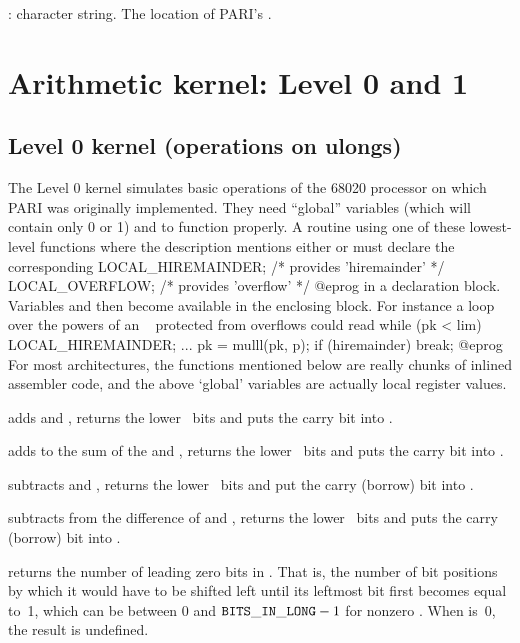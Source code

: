 
: character string. The location of PARI's .

\newpage
\chapter{Arithmetic kernel: Level 0 and 1}

\section{Level 0 kernel (operations on ulongs)}

The Level 0 kernel simulates basic operations of the 68020 processor on which
PARI was originally implemented. They need ``global''  variables
 (which will contain only 0 or 1) and  to
function properly. A routine using one of these lowest-level functions
where the description mentions either  or 
must declare the corresponding
\bprog
  LOCAL_HIREMAINDER;  /* provides 'hiremainder' */
  LOCAL_OVERFLOW;     /* provides 'overflow' */
@eprog\noindent
in a declaration block. Variables  and  then
become available in the enclosing block. For instance a loop over the powers
of an ~ protected from overflows could read
\bprog
 while (pk < lim)
 {
   LOCAL_HIREMAINDER;
   ...
   pk = mulll(pk, p); if (hiremainder) break;
 }
@eprog\noindent
For most architectures, the functions mentioned below are really chunks of
inlined assembler code, and the above `global' variables are actually
local register values.

 adds  and , returns the
lower \B\ bits and puts the carry bit into .

 adds  to the sum of the
 and , returns the lower \B\ bits and puts the carry bit into
.

 subtracts  and , returns
the lower \B\ bits and put the carry (borrow) bit into .

 subtracts  from the
difference of  and , returns the lower \B\ bits and puts the
carry (borrow) bit into .

 returns the number of leading zero bits in .
That is, the number of bit positions by which it would have to be shifted
left until its leftmost bit first becomes equal to~1, which can be between 0
and ${\tt BITS\_IN\_LONG}-1$ for nonzero . When  is~0, the result is undefined.

